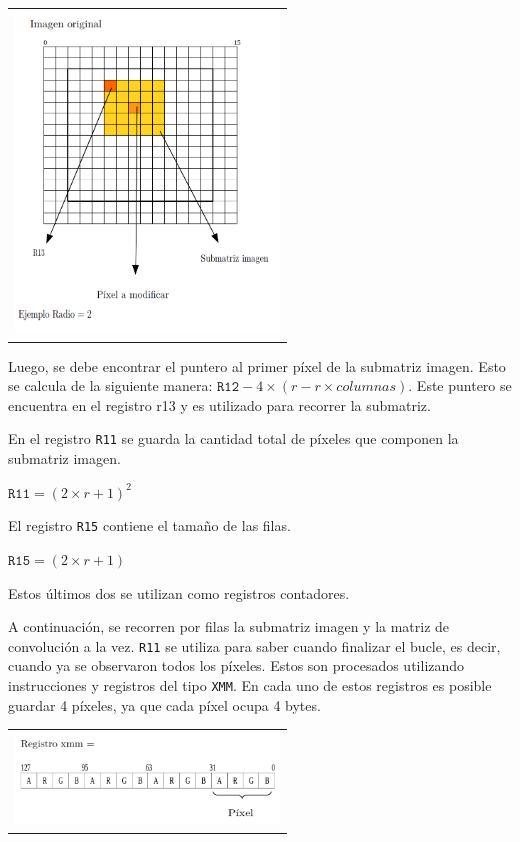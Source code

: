         {\centering \begin{tabular}{c}
          \includegraphics[width=7cm]{./imagenes/5.png} \\
        \end{tabular}}

        Luego, se debe encontrar el puntero al primer píxel de la submatriz imagen. Esto se calcula de la siguiente manera: $\mathtt{R12} - 4 \times (r - r \times columnas)$. Este puntero se encuentra en el registro r13 y es utilizado para recorrer la submatriz. 

        En el registro \texttt{R11} se guarda la cantidad total de píxeles que componen la submatriz imagen. 

              $\mathtt{R11} = (2 \times r + 1)^{2}$  
        
        El registro \texttt{R15} contiene el tamaño de las filas.
        
              $\mathtt{R15} = (2 \times r + 1)$

        Estos últimos dos se utilizan como registros contadores.

        A continuación, se recorren por filas la submatriz imagen y la matriz de convolución a la vez. \texttt{R11} se utiliza para saber cuando finalizar el bucle, es decir, cuando ya se observaron todos los píxeles. Estos son procesados utilizando instrucciones  y registros del tipo \texttt{XMM}. En cada uno de estos registros es posible guardar 4 píxeles, ya que cada píxel ocupa 4 bytes. 

        {\centering \begin{tabular}{c}
          \includegraphics[width=7cm]{./imagenes/6.png} \\
        \end{tabular}}
  
